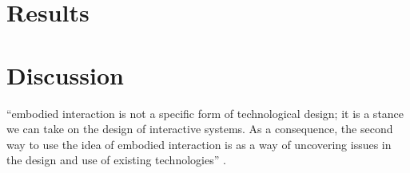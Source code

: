 \section{Results}

\section{Discussion}
``embodied interaction is not a specific form of technological design; it is a stance we can take on the design of interactive systems. As a consequence, the second way to use the idea of embodied interaction is as a way of uncovering issues in the design and use of existing technologies'' \cite[p. 145]{dourish}.
